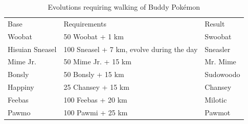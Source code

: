 \begin{table}
\footnotesize
\centering
\begin{tabular}{lll}
  Base & Requirements & Result \\
\Midrule
  Woobat & 50 Woobat + 1 km & Swoobat\\
  Hisuian Sneasel & 100 Sneasel + 7 km, evolve during the day & Sneasler\\
  Mime Jr. & 50 Mime Jr. + 15 km & Mr. Mime\\
  Bonsly & 50 Bonsly + 15 km & Sudowoodo\\
  Happiny & 25 Chansey + 15 km & Chansey\\
  Feebas & 100 Feebas + 20 km & Milotic\\
  Pawmo & 100 Pawmi + 25 km & Pawmot\\
\end{tabular}
  \caption{Evolutions requiring walking of Buddy Pokémon\label{table:walkevolutions}}
\end{table}
